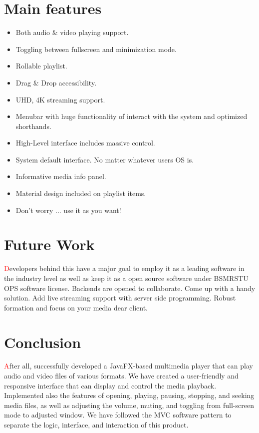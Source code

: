 \documentclass{report}
\begin{document}
\pagebreak

\section{Main features}
\begin{justify}
  {\large
  \begin{itemize}
    \item Both audio \& video playing support.
    \item Toggling between fullscreen and minimization mode.
    \item Rollable playlist.
    \item Drag \& Drop accessibility.
    \item UHD, 4K streaming support.
    \item Menubar with huge functionality of interact with the system and optimized shorthands.
    \item High-Level interface includes massive control.
    \item System default interface. No matter whatever users OS is.
    \item Informative media info panel.
    \item Material design included on playlist items.
    \item Don't worry ... use it as you want!
  \end{itemize}
  }
\end{justify}

\section{Future Work}
\begin{justify}
  {\large
  \hspace*{0.5cm} \textcolor{red}{\large D}evelopers behind this have a major goal to employ it as a leading software in the industry level as well as keep it as a open source software under BSMRSTU OPS software license.
  Backends are opened to collaborate. Come up with a handy solution. Add live streaming support with server side programming.
  Robust formation and focus on your media dear client.
  }
\end{justify}

\section{Conclusion}
\begin{justify}
  {\large
  \hspace*{0.5cm} \textcolor{red}{\large A}fter all, successfully developed a JavaFX-based multimedia player that can play audio and video files of various formats.
  We have created a user-friendly and responsive interface that can display and control the media playback.
  Implemented also the features of opening, playing, pausing, stopping, and seeking media files, as well as adjusting the volume, muting, and toggling from full-screen mode to adjusted window.
  We have followed the MVC software pattern to separate the logic, interface, and interaction of this product.
  }
\end{justify}
\end{document}
